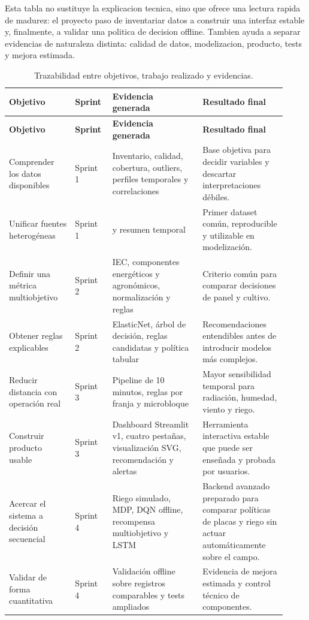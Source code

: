 ﻿\documentclass[11pt,a4paper]{article}
\newcommand{\code}[1]{\colorbox{lightbg}{\texttt{\small\detokenize{#1}}}}
\begin{document}
Esta tabla no sustituye la explicacion tecnica, sino que ofrece una lectura rapida de madurez: el proyecto paso de inventariar datos a construir una interfaz estable y, finalmente, a validar una politica de decision offline. Tambien ayuda a separar evidencias de naturaleza distinta: calidad de datos, modelizacion, producto, tests y mejora estimada.
\begin{longtable}{p{0.22\linewidth}p{0.12\linewidth}p{0.30\linewidth}p{0.28\linewidth}}
\caption{Trazabilidad entre objetivos, trabajo realizado y evidencias.}\\
\toprule
\textbf{Objetivo} & \textbf{Sprint} & \textbf{Evidencia generada} & \textbf{Resultado final} \\
\midrule
\endfirsthead
\toprule
\textbf{Objetivo} & \textbf{Sprint} & \textbf{Evidencia generada} & \textbf{Resultado final} \\
\midrule
\endhead
Comprender los datos disponibles & Sprint 1 & Inventario, calidad, cobertura, outliers, perfiles temporales y correlaciones & Base objetiva para decidir variables y descartar interpretaciones débiles. \\ \addlinespace
Unificar fuentes heterogéneas & Sprint 1 & \code{dataset_integrado_6h.csv} y resumen temporal & Primer dataset común, reproducible y utilizable en modelización. \\ \addlinespace
Definir una métrica multiobjetivo & Sprint 2 & IEC, componentes energéticos y agronómicos, normalización y reglas & Criterio común para comparar decisiones de panel y cultivo. \\ \addlinespace
Obtener reglas explicables & Sprint 2 & ElasticNet, árbol de decisión, reglas candidatas y política tabular & Recomendaciones entendibles antes de introducir modelos más complejos. \\ \addlinespace
Reducir distancia con operación real & Sprint 3 & Pipeline de 10 minutos, reglas por franja y microbloque & Mayor sensibilidad temporal para radiación, humedad, viento y riego. \\ \addlinespace
Construir producto usable & Sprint 3 & Dashboard Streamlit v1, cuatro pestañas, visualización SVG, recomendación y alertas & Herramienta interactiva estable que puede ser enseñada y probada por usuarios. \\ \addlinespace
Acercar el sistema a decisión secuencial & Sprint 4 & Riego simulado, MDP, DQN offline, recompensa multiobjetivo y LSTM & Backend avanzado preparado para comparar políticas de placas y riego sin actuar automáticamente sobre el campo. \\ \addlinespace
Validar de forma cuantitativa & Sprint 4 & Validación offline sobre registros comparables y tests ampliados & Evidencia de mejora estimada y control técnico de componentes. \\
\bottomrule
\end{longtable}
\end{document}
